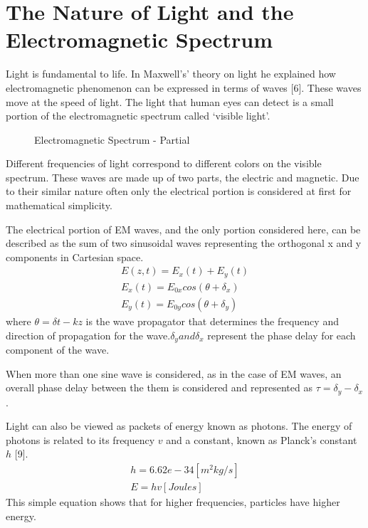 \section{The Nature of Light and the Electromagnetic Spectrum}
Light is fundamental to life.  In Maxwell’s’ theory on light he explained how electromagnetic phenomenon can be expressed in terms of waves [6].  These waves move at the speed of light.  The light that human eyes can detect is a small portion of the electromagnetic spectrum called ‘visible light’.
%
\begin{figure}[!htb]
    \begin{center}
    \end{center}
    \caption{Electromagnetic Spectrum - Partial}
    \label{fig:polarization}
\end{figure}
Different frequencies of light correspond to different colors on the visible spectrum.  These waves are made up of two parts, the electric and magnetic.  Due to their similar nature often only the electrical portion is considered at first for mathematical simplicity.

The electrical portion of EM waves, and the only portion considered here, can be described as the sum of two sinusoidal waves representing the orthogonal x and y components in Cartesian space.
%
\begin{align}
    E(z,t)=E_x (t)+E_y (t)\\
    E_x (t)=E_{0x} cos( \theta+\delta_x )\\
    E_y (t)=E_{0y} cos( \theta+\delta_y )
\end{align}
%
where $ \theta = \delta t-kz $ is the wave propagator that determines the frequency and direction of propagation for the wave.$ \delta_y and \delta_x $ represent the phase delay for each component of the wave.

When more than one sine wave is considered, as in the case of EM waves, an overall phase delay between the them is considered and represented as $ \tau=\delta_y-\delta_x $.

Light can also be viewed as packets of energy known as photons.  The energy of photons is related to its frequency $v$ and a constant, known as Planck’s constant $h$ [9].
%
\begin{align}
	h=6.62e-34 [m^2 kg/s]\\
	E=hv [Joules]
\end{align}
%
This simple equation shows that for higher frequencies, particles have higher energy.






